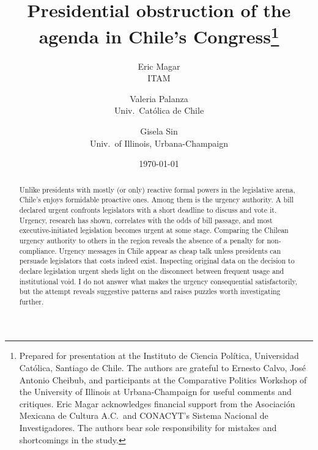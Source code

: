\documentclass[letter,12pt]{article}
\begin{document}
\title{Presidential obstruction of the \\agenda in Chile's Congress\thanks{Prepared for presentation at the Instituto de Ciencia Pol\'itica, Universidad Cat\'olica, Santiago de Chile. The authors are grateful to Ernesto Calvo, Jos\'e Antonio Cheibub, and participants at the Comparative Politics Workshop of the University of Illinois at Urbana-Champaign for useful comments and critiques. Eric Magar acknowledges financial support from the Asociaci\'on Mexicana de Cultura A.C.\ and CONACYT's Sistema Nacional de Investigadores. The authors bear sole responsibility for mistakes and shortcomings in the study.}}
\author{Eric Magar \\ ITAM \and
        Valeria Palanza \\ Univ.\ Cat\'olica de Chile \and  
        Gisela Sin \\ Univ.\ of Illinois, Urbana-Champaign 
}
\date{\today}
\maketitle


\begin{abstract}
\noindent Unlike presidents with mostly (or only) reactive formal powers in the legislative arena, Chile's enjoys formidable proactive ones. Among them is the urgency authority. A bill declared urgent confronts legislators with a short deadline to discuss and vote it. Urgency, research has shown, correlates with the odds of bill passage, and most executive-initiated legislation becomes urgent at some stage. Comparing the Chilean urgency authority to others in the region reveals the absence of a penalty for non-compliance. Urgency messages in Chile appear as cheap talk unless presidents can persuade legislators that costs indeed exist. Inspecting original data on the decision to declare legislation urgent sheds light on the disconnect between frequent usage and institutional void. I do not answer what makes the urgency consequential satisfactorily, but the attempt reveals suggestive patterns and raises puzzles worth investigating further. 
\end{abstract}

\end{document}
